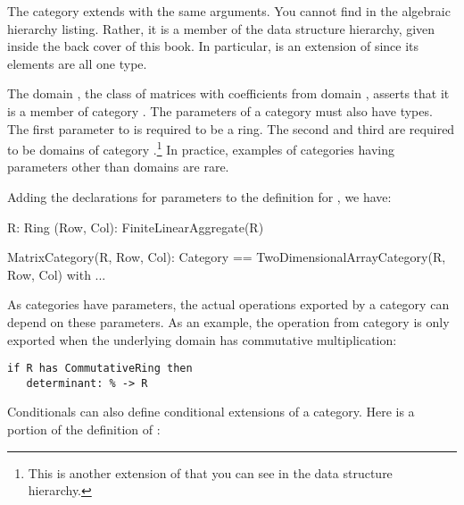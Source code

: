 {{{{{{The category extends  with
the same arguments.
You cannot find  in the
algebraic hierarchy listing.
Rather, it is a member of the data structure hierarchy,
given inside the back cover of this book.
In particular,  is an extension of
 since its elements are all one type.

The domain , the class of matrices with coefficients
from domain , asserts that it is a member of category
.
The parameters of a category must also have types.
The first parameter to 
 is required to be a ring.
The second and third are required to be domains of category
.\footnote{%
This is another extension of
 that you can see in
the data structure hierarchy.}
In practice, examples of categories having parameters other than
domains are rare.

Adding the declarations for parameters to the definition for
, we have:

\begin{xmpLines}
R: Ring
(Row, Col): FiniteLinearAggregate(R)

MatrixCategory(R, Row, Col): Category ==
    TwoDimensionalArrayCategory(R, Row, Col) with ...
\end{xmpLines}


As categories have parameters, the actual operations exported by a
category can depend on these parameters.
As an example, the operation 
from category  is only exported when the
underlying domain  has commutative multiplication:

\begin{verbatim}
if R has CommutativeRing then
   determinant: % -> R
\end{verbatim}

Conditionals can also define conditional extensions of a category.
Here is a portion of the definition of :

}}}}}}
